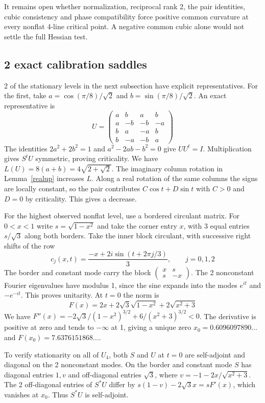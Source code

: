 \documentclass[11pt,a4paper]{article}
\begin{document}
It remains open whether normalization, reciprocal rank 2, the pair
identities, cubic consistency and phase compatibility force positive
common curvature at every nonflat 4-line critical point. A negative
common cubic alone would not settle the full Hessian test.

\subsection{2 exact calibration saddles}\label{fourcalibration}
2 of the stationary levels in the next subsection have explicit representatives.
For the first, take $a=\cos(\pi/8)/\sqrt2$ and
$b=\sin(\pi/8)/\sqrt2$. An exact representative is
\[
 U=\begin{pmatrix}
 a&b&a&b\\ a&-b&-b&-a\\ b&a&-a&b\\ b&-a&-b&a
 \end{pmatrix}
\]
The identities $2a^2+2b^2=1$ and $a^2-2ab-b^2=0$ give $UU^t=I$.
Multiplication gives $S^tU$ symmetric, proving criticality. We have
$L(U)=8(a+b)=4\sqrt{2+\sqrt2}$. The imaginary column rotation in
Lemma~\ref{realup} increases $L$. Along a real rotation of the same columns the
signs are locally constant, so the pair contributes $C\cos t+D\sin t$
with $C>0$ and $D=0$ by criticality. This gives a decrease.

For the highest observed nonflat level, use a bordered circulant matrix.
For $0<x<1$ write $s=\sqrt{1-x^2}$ and take the corner entry $x$, with
3 equal entries $s/\sqrt3$ along both borders. Take the inner block
circulant, with successive right shifts of the row
\[
 c_j(x,t)=\frac{-x+2i\sin(t+2\pi j/3)}{3},\qquad j=0,1,2
\]
The border and constant mode carry the block
$\left(\begin{smallmatrix}x&s\\s&-x\end{smallmatrix}\right)$.
The 2 nonconstant Fourier eigenvalues have modulus 1, since the sine
expands into the modes $e^{it}$ and $-e^{-it}$. This proves unitarity.
At $t=0$ the norm is
\[
 F(x)=2x+2\sqrt3\sqrt{1-x^2}+2\sqrt{x^2+3}
\]
We have $F''(x)=-2\sqrt3/(1-x^2)^{3/2}+6/(x^2+3)^{3/2}<0$.
The derivative is positive at zero and tends to $-\infty$ at 1, giving
a unique zero $x_0=0.6096097890\ldots$ and $F(x_0)=7.6376151868\ldots$.

To verify stationarity on all of $U_4$, both $S$ and $U$ at $t=0$
are self-adjoint and diagonal on the 2 nonconstant modes. On the
border and constant mode $S$ has diagonal entries $1,v$ and off-diagonal
entries $\sqrt3$, where $v=-1-2x/\sqrt{x^2+3}$. The 2 off-diagonal
entries of $S^*U$ differ by $s(1-v)-2\sqrt3 x=sF'(x)$, which vanishes
at $x_0$. Thus $S^*U$ is self-adjoint.
\end{document}

